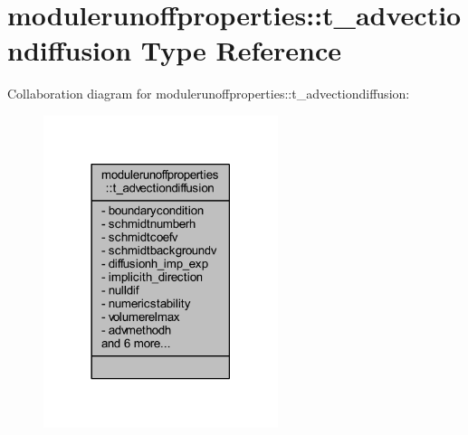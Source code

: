 \hypertarget{structmodulerunoffproperties_1_1t__advectiondiffusion}{}\section{modulerunoffproperties\+:\+:t\+\_\+advectiondiffusion Type Reference}
\label{structmodulerunoffproperties_1_1t__advectiondiffusion}


Collaboration diagram for modulerunoffproperties\+:\+:t\+\_\+advectiondiffusion\+:\nopagebreak
\begin{figure}[H]
\begin{center}
\leavevmode
\includegraphics[width=194pt]{structmodulerunoffproperties_1_1t__advectiondiffusion__coll__graph}
\end{center}
\end{figure}
